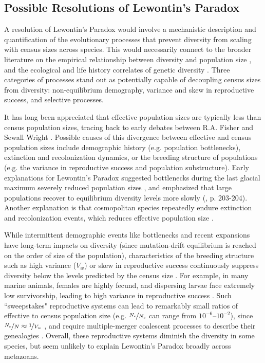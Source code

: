 \documentclass[9pt,lineno]{elife}
\begin{document}
\subsection{Possible Resolutions of Lewontin's Paradox}

A resolution of Lewontin's Paradox would involve a mechanistic description and
quantification of the evolutionary processes that prevent diversity from
scaling with census sizes across species. This would necessarily connect to the
broader literature on the empirical relationship between diversity and
population size \citep{Frankham1996-yb,Nei1984-zi,Soule1976-he,Leroy2021-gy},
and the ecological and life history correlates of genetic diversity
\citep{Nevo1978-wh,Powell1975-lg,Nevo1984-hp}. Three categories of processes
stand out as potentially capable of decoupling census sizes from diversity:
non-equilibrium demography, variance and skew in reproductive success, and
selective processes.

It has long been appreciated that effective population sizes are typically less
than census population sizes, tracing back to early debates between R.A. Fisher
and Sewall Wright \citep{Fisher1947-tf,Wright1948-fj}. Possible causes of
this divergence between effective and census population sizes include
demographic history (e.g. population bottlenecks), extinction and
recolonization dynamics, or the breeding structure of populations (e.g. the
variance in reproductive success and population substructure). Early
explanations for Lewontin's Paradox suggested bottlenecks during the last
glacial maximum severely reduced population sizes
\citep{Kimura1984-ia,Ohta1973-pk,Nei1984-zi}, and emphasized that large
populations recover to equilibrium diversity levels more slowly
(\cite{Nei1984-zi}, \cite{Kimura1984-ia} p. 203-204). Another explanation is
that cosmopolitan species repeatedly endure extinction and recolonization
events, which reduces effective population size
\citep{Maruyama1980-xz,Slatkin1977-kd}. 

While intermittent demographic events like bottlenecks and recent expansions
have long-term impacts on diversity (since mutation-drift equilibrium is
reached on the order of size of the population), characteristics of the
breeding structure such as high variance ($V_w$) or skew in reproductive
success continuously suppress diversity below the levels predicted by the
census size \citep{Wright1938-tv}. For example, in many marine animals, females
are highly fecund, and dispersing larvae face extremely low survivorship,
leading to high variance in reproductive success
\citep{Waples2018-kb,Waples2013-wi,Hedgecock2011-ku,Hauser2008-fd}. Such
``sweepstakes" reproductive systems can lead to remarkably small ratios of
effective to census population size (e.g. $\nicefrac{N_e}{N_c}$ can range from
$10^{-6}$--$10^{-2}$), since $\nicefrac{N_e}{N} \approx \nicefrac{1}{V_w}$
\citep{Hedgecock1994-gs,Wright1938-tv,Nunney1993-ef,Nunney1996-wy}, and require
multiple-merger coalescent processes to describe their genealogies
\citep{Eldon2006-ui}. Overall, these reproductive systems diminish the
diversity in some species, but seem unlikely to explain Lewontin's Paradox
broadly across metazoans.
\end{document}
